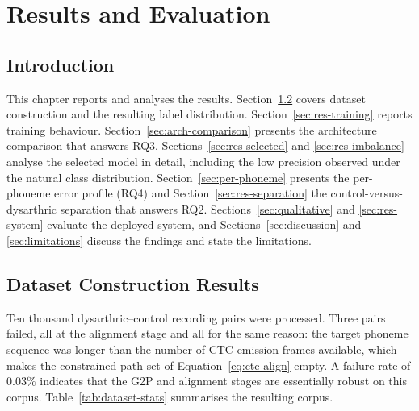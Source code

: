 \chapter{Results and Evaluation}
\label{ch:results}

\section{Introduction}

This chapter reports and analyses the results. Section~\ref{sec:res-dataset}
covers dataset construction and the resulting label distribution.
Section~\ref{sec:res-training} reports training behaviour.
Section~\ref{sec:arch-comparison} presents the architecture comparison that
answers RQ3. Sections~\ref{sec:res-selected} and \ref{sec:res-imbalance} analyse
the selected model in detail, including the low precision observed under the
natural class distribution. Section~\ref{sec:per-phoneme} presents the
per-phoneme error profile (RQ4) and Section~\ref{sec:res-separation} the
control-versus-dysarthric separation that answers RQ2.
Sections~\ref{sec:qualitative} and \ref{sec:res-system} evaluate the deployed
system, and Sections~\ref{sec:discussion} and \ref{sec:limitations} discuss the
findings and state the limitations.

\section{Dataset Construction Results}
\label{sec:res-dataset}

Ten thousand dysarthric--control recording pairs were processed. Three pairs
failed, all at the alignment stage and all for the same reason: the target
phoneme sequence was longer than the number of CTC emission frames available,
which makes the constrained path set of Equation~\eqref{eq:ctc-align} empty. A
failure rate of $0.03\%$ indicates that the G2P and alignment stages are
essentially robust on this corpus. Table~\ref{tab:dataset-stats} summarises the
resulting corpus.

